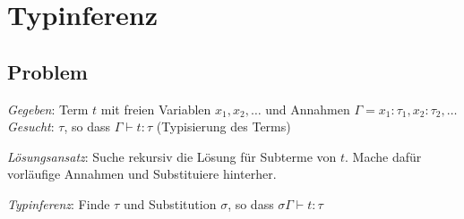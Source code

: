 

\section{Typinferenz}

\subsection{Problem}
\textit{Gegeben}: Term \(t\) mit freien Variablen \(x_1, x_2, \ldots\) und Annahmen \(\Gamma = x_1 : \tau_1, x_2 : \tau_2, \ldots\)\\
\textit{Gesucht}: \(\tau\), so dass \(\Gamma \vdash t: \tau\) (Typisierung des Terms)

\textit{Lösungsansatz}: Suche rekursiv die Lösung für Subterme von \(t\). Mache dafür vorläufige Annahmen und Substituiere hinterher.

\textit{Typinferenz}: Finde \(\tau\) und Substitution \(\sigma\), so dass \(\sigma \Gamma \vdash t: \tau\)